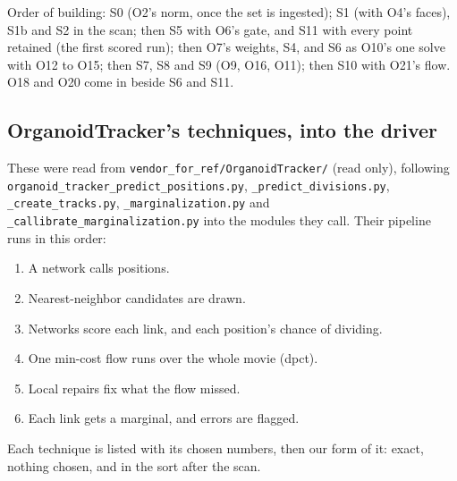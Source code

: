 Order of building: S0 (O2's norm, once the set is ingested); S1 (with O4's faces), S1b and S2 in the scan; then S5 with O6's gate, and S11 with every point retained (the first scored run); then O7's weights, S4, and S6 as O10's one solve with O12 to O15; then S7, S8 and S9 (O9, O16, O11); then S10 with O21's flow. O18 and O20 come in beside S6 and S11.

\subsection{\texorpdfstring{OrganoidTracker's techniques, into the driver}{OrganoidTracker's techniques, into the driver}}

These were read from \texttt{vendor\_\allowbreak{}for\_\allowbreak{}ref/\allowbreak{}Organoid\allowbreak{}Tracker/\allowbreak{}} (read only), following \texttt{organoid\_\allowbreak{}tracker\_\allowbreak{}predict\_\allowbreak{}positions.\allowbreak{}py}, \texttt{\_\allowbreak{}predict\_\allowbreak{}divisions.\allowbreak{}py}, \texttt{\_\allowbreak{}create\_\allowbreak{}tracks.\allowbreak{}py}, \texttt{\_\allowbreak{}marginalization.\allowbreak{}py} and \texttt{\_\allowbreak{}callibrate\_\allowbreak{}marginalization.\allowbreak{}py} into the modules they call. Their pipeline runs in this order:

\begin{enumerate}
\item A network calls positions.
\item Nearest-neighbor candidates are drawn.
\item Networks score each link, and each position's chance of dividing.
\item One min-cost flow runs over the whole movie (dpct).
\item Local repairs fix what the flow missed.
\item Each link gets a marginal, and errors are flagged.
\end{enumerate}

Each technique is listed with its chosen numbers, then our form of it: exact, nothing chosen, and in the sort after the scan.

